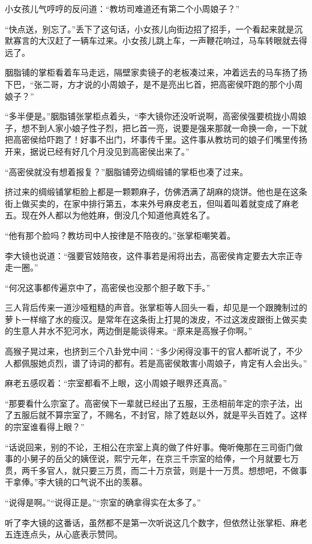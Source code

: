 小女孩儿气哼哼的反问道：“教坊司难道还有第二个小周娘子？”

“快点送，别忘了。”丢下了这句话，小女孩儿向街边招了招手，一个看起来就是沉默寡言的大汉赶了一辆车过来。小女孩儿跳上车，一声鞭花响过，马车转眼就去得远了。

胭脂铺的掌柜看着车马走远，隔壁家卖镜子的老板凑过来，冲着远去的马车扬了扬下巴，“张二哥，方才说的小周娘子，是不是亮出匕首，把高密侯吓跑的那个小周娘子？”

“多半便是。”胭脂铺张掌柜点着头，“李大镜你还没听说啊，高密侯强要梳拢小周娘子，想不到人家小娘子性子烈，把匕首一亮，说要是强来那就一命换一命，一下就把高密侯给吓跑了！好事不出门，坏事传千里。这件事从教坊司的娘子们嘴里传扬开来，据说已经有好几个月没见到高密侯出来了。”

“高密侯就没有想着报复？”胭脂铺旁边绸缎铺的掌柜也凑了过来。

挤过来的绸缎铺掌柜脸上都是一颗颗麻子，仿佛洒满了胡麻的烧饼。他也是在这条街上做买卖的，在家中排行第五，本来外号麻皮老五，但叫着叫着就变成了麻老五。现在外人都以为他姓麻，倒没几个知道他真姓名了。

“他有那个脸吗？教坊司中人按律是不陪夜的。”张掌柜嘲笑着。

李大镜也说道：“强要官妓陪夜，这件事若是闹将出去，高密侯肯定要去大宗正寺走一圈。”

“何况这事都传遍京中了，高密侯也没那个胆子敢下手。”

三人背后传来一道沙哑粗糙的声音。张掌柜等人回头一看，却见是一个跟腌制过的萝卜一样缩了水的瘦汉。是常年在这条街上打晃的泼皮，不过这泼皮跟街上做买卖的生意人井水不犯河水，两边倒是能谈得来。“原来是高猴子你啊。”

高猴子晃过来，也挤到三个八卦党中间：“多少闲得没事干的官人都听说了，不少人都佩服她贞烈，谱了诗词的都有。若是高密侯敢害小周娘子，肯定有人会出头。”

麻老五感叹着：“宗室都看不上眼，这小周娘子眼界还真高。”

“那要看什么宗室了。高密侯下一辈就已经出了五服，王丞相前年定的宗子法，出了五服后就不算宗室了，不赐名，不封官，除了姓赵以外，就是平头百姓了。这样的宗室谁看得上眼？”

“话说回来，别的不论，王相公在宗室上真的做了件好事。俺听俺那在三司衙门做事的小舅子的岳父的姨侄说，熙宁元年，在京三千宗室的给俸，一个月就要七万贯，两千多官人，就只要三万贯，而二十万京营，则是十一万贯。想想吧，不做事干拿俸。”李大镜的口气说不出的羡慕。

“说得是啊。”“说得正是。”“宗室的确拿得实在太多了。”

听了李大镜的这番话，虽然都不是第一次听说这几个数字，但依然让张掌柜、麻老五连连点头，从心底表示赞同。

